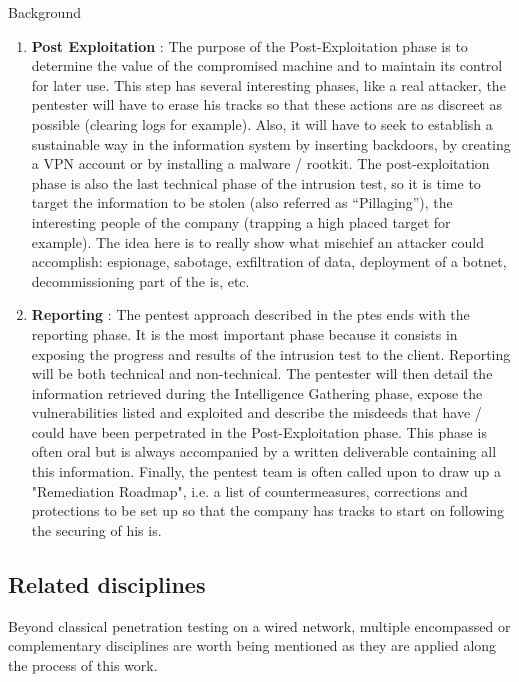 \begin{chaptercover}{Background}
\begin{enumerate}
  \item \textbf{Post Exploitation} : The purpose of the Post-Exploitation phase is to determine the value of the compromised machine and to maintain its control for later use. This step has several interesting phases, like a real attacker, the pentester will have to erase his tracks so that these actions are as discreet as possible (clearing logs for example). Also, it will have to seek to establish a sustainable way in the information system by inserting backdoors, by creating a VPN account or by installing a malware / rootkit. The post-exploitation phase is also the last technical phase of the intrusion test, so it is time to target the information to be stolen (also referred as “Pillaging”), the interesting people of the company (trapping a high placed target for example). The idea here is to really show what mischief an attacker could accomplish: espionage, sabotage, exfiltration of data, deployment of a botnet, decommissioning part of the \acrshort{is}, etc.
  \item \textbf{Reporting} : The pentest approach described in the \acrshort{ptes} ends with the reporting phase. It is the most important phase because it consists in exposing the progress and results of the intrusion test to the client. Reporting will be both technical and non-technical. The pentester will then detail the information retrieved during the Intelligence Gathering phase, expose the vulnerabilities listed and exploited and describe the misdeeds that have / could have been perpetrated in the Post-Exploitation phase. This phase is often oral but is always accompanied by a written deliverable containing all this information. Finally, the pentest team is often called upon to draw up a "Remediation Roadmap", i.e. a list of countermeasures, corrections and protections to be set up so that the company has tracks to start on following the securing of his \acrshort{is}.
\end{enumerate}

\subsection{Related disciplines}

Beyond classical penetration testing on a wired network, multiple encompassed or complementary disciplines are worth being mentioned as they are applied along the process of this work.


\end{chaptercover}
